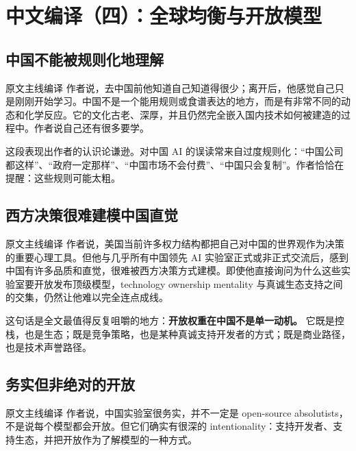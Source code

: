 \section{中文编译（四）：全球均衡与开放模型}

\subsection{中国不能被规则化地理解}

\begin{translationbox}{原文主线编译}
作者说，去中国前他知道自己知道得很少；离开后，他感觉自己只是刚刚开始学习。中国不是一个能用规则或食谱表达的地方，而是有非常不同的动态和化学反应。它的文化古老、深厚，并且仍然完全嵌入国内技术如何被建造的过程中。作者说自己还有很多要学。
\end{translationbox}

这段表现出作者的认识论谦逊。对中国 AI 的误读常来自过度规则化：``中国公司都这样''、``政府一定那样''、``中国市场不会付费''、``中国只会复制''。作者恰恰在提醒：这些规则可能太粗。

\subsection{西方决策很难建模中国直觉}

\begin{translationbox}{原文主线编译}
作者说，美国当前许多权力结构都把自己对中国的世界观作为决策的重要心理工具。但他与几乎所有中国领先 AI 实验室正式或非正式交流后，感到中国有许多品质和直觉，很难被西方决策方式建模。即使他直接询问为什么这些实验室要开放发布顶级模型，technology ownership mentality 与真诚生态支持之间的交集，仍然让他难以完全连点成线。
\end{translationbox}

这句话是全文最值得反复咀嚼的地方：\textbf{开放权重在中国不是单一动机。} 它既是控栈，也是生态；既是竞争策略，也是某种真诚支持开发者的方式；既是商业路径，也是技术声誉路径。

\subsection{务实但非绝对的开放}

\begin{translationbox}{原文主线编译}
作者说，中国实验室很务实，并不一定是 open-source absolutists，不是说每个模型都会开放。但它们确实有很深的 intentionality：支持开发者、支持生态，并把开放作为了解模型的一种方式。
\end{translationbox}

